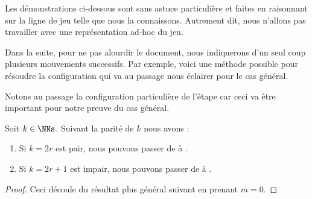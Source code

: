 Les démonstrations ci-dessous sont sans astuce particulière et faites en raisonnant sur la ligne de jeu telle que nous la connaissons. Autrement dit, nous n'allons pas travailler avec une représentation ad-hoc du jeu.


\begin{remark}
    Dans la suite, pour ne pas alourdir le document, nous indiquerons d'un seul coup plusieurs mouvements successifs.
    Par exemple, voici une méthode possible pour résoudre la configuration  qui va au passage nous éclairer pour le cas général.
    \begin{mvts}
        \medskip
        \item  {}

        \medskip
        \item  {}

        \medskip
        \item  {}

        \medskip
        \item  {}

        \medskip
        \item  {}
    \end{mvts}

    Notons au passage la configuration particulière de l'étape  car ceci va être important pour notre preuve du cas général.
\end{remark}



\begin{fact} \label{kNkB-reduction}
    Soit $k \in \NNs$. Suivant la parité de $k$ nous avons :
    \begin{enumerate}
        \item Si $k = 2r$ est pair, nous pouvons passer de  à  .

        \item Si $k = 2r+1$ est impair, nous pouvons passer de  à  .
    \end{enumerate}
\end{fact}


\begin{proof}
    Ceci découle du résultat plus général suivant en prenant $m = 0$.
\end{proof}



